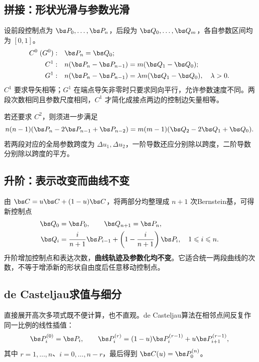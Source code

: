 \subsection{拼接：形状光滑与参数光滑}
设前段控制点为 $\bs P_0,\ldots,\bs P_n$，后段为 $\bs Q_0,\ldots,\bs Q_m$，各自参数区间均为 $[0,1]$。
\begin{align*}
 C^0\;(G^0):&\quad \bs P_n=\bs Q_0;\\
 C^1:&\quad n(\bs P_n-\bs P_{n-1})=m(\bs Q_1-\bs Q_0);\\
 G^1:&\quad n(\bs P_n-\bs P_{n-1})
       =\lambda m(\bs Q_1-\bs Q_0),\quad\lambda>0.
\end{align*}
$C^1$ 要求导矢相等；$G^1$ 在端点导矢非零时只要求同向平行，允许参数速度不同。两段次数相同且参数尺度相同，$C^1$ 才简化成接点两边的控制边矢量相等。

若还要求 $C^2$，则须进一步满足
\[
 n(n-1)(\bs P_n-2\bs P_{n-1}+\bs P_{n-2})
 =m(m-1)(\bs Q_2-2\bs Q_1+\bs Q_0).
\]
若两段对应的全局参数跨度为 $\Delta u_1,\Delta u_2$，一阶导数还应分别除以跨度，二阶导数分别除以跨度的平方。


\subsection{升阶：表示改变而曲线不变}
由 $\bs C=u\bs C+(1-u)\bs C$，将两部分均整理成 $n+1$ 次Bernstein基，可得新控制点
\begin{align*}
 \bs Q_0&=\bs P_0,\qquad \bs Q_{n+1}=\bs P_n,\\
 \bs Q_i&=\frac{i}{n+1}\bs P_{i-1}
          +\left(1-\frac{i}{n+1}\right)\bs P_i,\quad 1\leq i\leq n.
\end{align*}
升阶增加控制点和表达次数，\textbf{曲线轨迹及参数化均不变}。它适合统一两段曲线的次数，不等于增添新的形状自由度后任意移动控制点。


\subsection{de Casteljau求值与细分}
直接展开高次多项式既不便计算，也不直观。de Casteljau算法在相邻点间反复作同一比例的线性插值：
\[
 \bs P_i^{(0)}=\bs P_i,\qquad
 \bs P_i^{(r)}=(1-u)\bs P_i^{(r-1)}+u\bs P_{i+1}^{(r-1)},
\]
其中 $r=1,\ldots,n$、$i=0,\ldots,n-r$，最后得到 $\bs C(u)=\bs P_0^{(n)}$。

